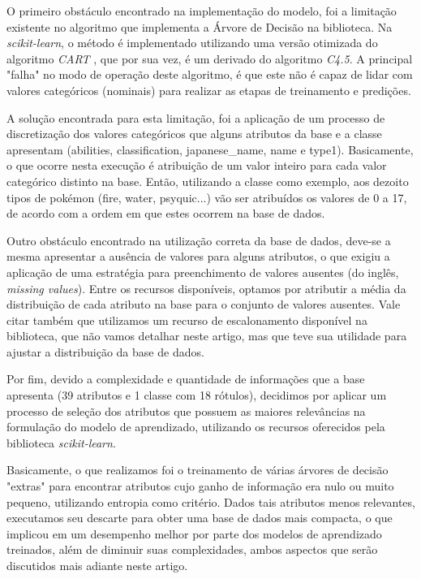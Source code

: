 \documentclass[12pt]{article}
\begin{document}
O primeiro obstáculo encontrado na implementação do modelo, foi a limitação existente no algoritmo que implementa a Árvore de Decisão na biblioteca. Na \emph{scikit-learn}, o método é implementado utilizando uma versão otimizada do algoritmo \emph{CART} \cite{CART}, que por sua vez, é um derivado do algoritmo \emph{C4.5}. A principal "falha" \hspace{0.01cm} no modo de operação deste algoritmo, é que este não é capaz de lidar com valores categóricos (nominais) para realizar as etapas de treinamento e predições.

A solução encontrada para esta limitação, foi a aplicação de um processo de discretização dos valores categóricos que alguns atributos da base e a classe apresentam (abilities, classification, japanese\_name, name e type1). Basicamente, o que ocorre nesta execução é atribuição de um valor inteiro para cada valor categórico distinto na base. Então, utilizando a classe como exemplo, aos dezoito tipos de pokémon (fire, water, psyquic...) vão ser atribuídos os valores de 0 a 17, de acordo com a ordem em que estes ocorrem na base de dados.

Outro obstáculo encontrado na utilização correta da base de dados, deve-se a mesma apresentar a ausência de valores para alguns atributos, o que exigiu a aplicação de uma estratégia para preenchimento de valores ausentes (do inglês, \emph{missing values}). Entre os recursos disponíveis, optamos por atributir a média da distribuição de cada atributo na base para o conjunto de valores ausentes. Vale citar também que utilizamos um recurso de escalonamento disponível na biblioteca, que não vamos detalhar neste artigo, mas que teve sua utilidade para ajustar a distribuição da base de dados.

Por fim, devido a complexidade e quantidade de informações que a base apresenta (39 atributos e 1 classe com 18 rótulos), decidimos por aplicar um processo de seleção dos atributos que possuem as maiores relevâncias na formulação do modelo de aprendizado, utilizando os recursos oferecidos pela biblioteca \emph{scikit-learn}. 

Basicamente, o que realizamos foi o treinamento de várias árvores de decisão "extras" para encontrar atributos cujo ganho de informação era nulo ou muito pequeno, utilizando entropia como critério. Dados tais atributos menos relevantes, executamos seu descarte para obter uma base de dados mais compacta, o que implicou em um desempenho melhor por parte dos modelos de aprendizado treinados, além de diminuir suas complexidades, ambos aspectos que serão discutidos mais adiante neste artigo.
\end{document}
